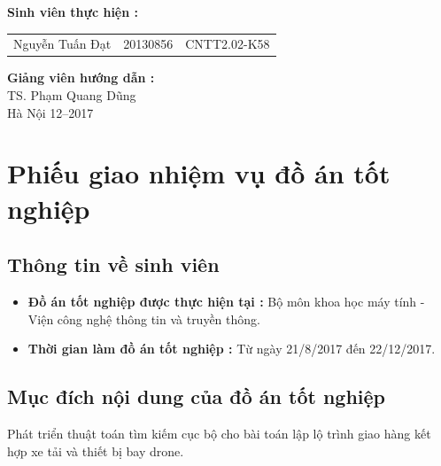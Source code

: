\documentclass[a4paper,12pt]{report}
\begin{document}
\begin{center}
\hspace{-6cm}\fontsize{14}{16}\selectfont \textbf{Sinh viên thực hiện :}\\[0.1cm] 
\begin{longtable}{l c c}
Nguyễn Tuấn Đạt & 20130856 & CNTT2.02-K58 
\end{longtable}
\vspace{0.3cm}
\hspace{-6cm}\fontsize{14}{16}\selectfont \textbf{Giảng viên hướng dẫn :}\\[0.1cm]
\hspace{-2.7cm}\fontsize{14}{16}\selectfont TS. Phạm Quang Dũng \\[3cm]
\fontsize{16}{19}\selectfont Hà Nội 12--2017
\end{center}
\chapter*{Phiếu giao nhiệm vụ đồ án tốt nghiệp}
\section*{Thông tin về sinh viên}

\begin{itemize}
\item \textbf{Đồ án tốt nghiệp được thực hiện tại :} Bộ môn khoa học máy tính - Viện công nghệ thông tin và truyền thông.
\item \textbf{Thời gian làm đồ án tốt nghiệp : } Từ ngày 21/8/2017 đến 22/12/2017.
\end{itemize}
\section*{Mục đích nội dung của đồ án tốt nghiệp}
Phát triển thuật toán tìm kiếm cục bộ cho bài toán lập lộ trình giao hàng kết hợp xe tải và thiết bị bay drone.
\end{document}
